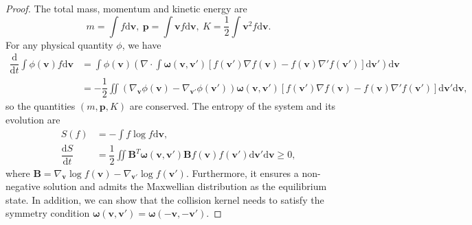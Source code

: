 \documentclass[preprint,1p,times]{elsarticle}
\theoremstyle{definition}
\theoremstyle{remark}
\begin{document}
\begin{proof}
    The total mass, momentum and kinetic energy are 
    \begin{equation}\label{eq:MPK}
        m = \int f \mathrm{d} \boldsymbol{v}, ~ \boldsymbol{p} = \int \boldsymbol{v}f \mathrm{d} \boldsymbol{v}, ~ K = \frac{1}{2}\int \boldsymbol{v}^2 f \mathrm{d} \boldsymbol{v}.
    \end{equation}
    For any physical quantity $\phi$, we have
    \begin{equation}\label{eq:conservation}
        \begin{aligned}
            \dfrac{\mathrm{d}}{\mathrm{d} t} \int \phi(\boldsymbol{v}) f \mathrm{d} \boldsymbol{v} &= \int \phi(\boldsymbol{v}) \left(\nabla \cdot \int \boldsymbol{\omega} (\boldsymbol{v},\boldsymbol{v}') \left[ f(\boldsymbol{v}') \nabla f(\boldsymbol{v}) - f(\boldsymbol{v}) \nabla' f(\boldsymbol{v}') \right] \mathrm{d}\boldsymbol{v}'\right) \mathrm{d}\boldsymbol{v}\\
            &= -\dfrac{1}{2}\iint \left(\nabla_{\boldsymbol{v}} \phi(\boldsymbol{v}) - \nabla_{\boldsymbol{v}'} \phi(\boldsymbol{v}')\right) \boldsymbol{\omega}(\boldsymbol{v},\boldsymbol{v}') \left[ f(\boldsymbol{v}') \nabla f(\boldsymbol{v}) - f(\boldsymbol{v}) \nabla' f(\boldsymbol{v}') \right] \mathrm{d}\boldsymbol{v}' \mathrm{d}\boldsymbol{v},
        \end{aligned}
    \end{equation}
    so the quantities $(m,\boldsymbol{p},K)$ are conserved.
    The entropy of the system and its evolution are
    \begin{equation}\label{eq:Hthm}
        \begin{aligned}
            S(f)&=-\int f \log f \mathrm{d}\boldsymbol{v},\\
            \dfrac{\mathrm{d}S}{\mathrm{d}t} &= \dfrac{1}{2}\iint  \boldsymbol{B}^{T} \boldsymbol{\omega}(\boldsymbol{v},\boldsymbol{v}') \boldsymbol{B} f(\boldsymbol{v})f(\boldsymbol{v}') \mathrm{d}\boldsymbol{v}' \mathrm{d}\boldsymbol{v} \geq 0,
        \end{aligned}
    \end{equation}
    where $\boldsymbol{B} = \nabla_{\boldsymbol{v}} \log f(\boldsymbol{v}) - \nabla_{\boldsymbol{v}'} \log f(\boldsymbol{v}')$. Furthermore, it ensures a non-negative solution and admits the Maxwellian distribution as the equilibrium state. In addition, we can show that the collision kernel needs to satisfy the symmetry condition $\boldsymbol{\omega}(\boldsymbol{v},\boldsymbol{v}') = \boldsymbol{\omega}(-\boldsymbol{v},-\boldsymbol{v}')$.
\end{proof}
\end{document}
